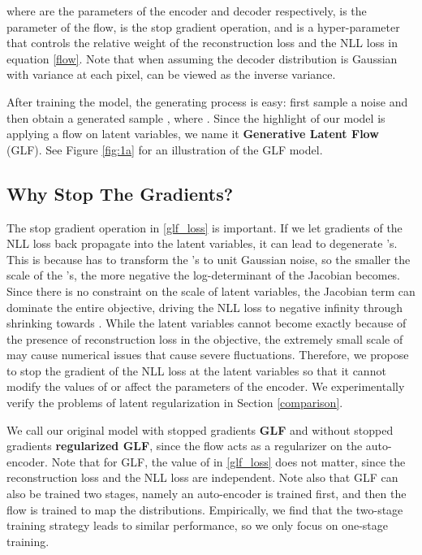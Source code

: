 \documentclass{article}
\begin{document}
where  are the parameters of the encoder and decoder respectively,  is the parameter of the flow,  is the stop gradient operation, and  is a hyper-parameter that controls the relative weight of the reconstruction loss and the NLL loss in equation \eqref{flow}. Note that when assuming the decoder distribution is Gaussian with variance  at each pixel,  can be viewed as the inverse variance.
 
After training the model, the generating process is easy: first sample a noise  and then obtain a generated sample , where . Since the highlight of our model is applying a flow on latent variables, we name it \textbf{Generative Latent Flow} (GLF). See Figure \ref{fig:1a} for an illustration of the GLF model.
 
\subsection{Why Stop The Gradients?}\label{strategies}
The stop gradient operation in \eqref{glf_loss} is important. If we let gradients of the NLL loss back propagate into the latent variables, it can lead to degenerate 's. This is because  has to transform the 's to unit Gaussian noise, so the smaller the scale of the 's, the more negative the log-determinant of the Jacobian becomes. Since there is no constraint on the scale of latent variables, the Jacobian term can dominate the entire objective, driving the NLL loss to negative infinity through shrinking  towards . While the latent variables cannot become exactly  because of the presence of reconstruction loss in the objective, the extremely small scale of  may cause numerical issues that cause severe fluctuations. Therefore, we propose to stop the gradient of the NLL loss at the latent variables so that it cannot modify the values of  or affect the parameters of the encoder. We experimentally verify the problems of latent regularization in Section \ref{comparison}.

We call our original model with  stopped gradients \textbf{GLF} and without stopped gradients \textbf{regularized GLF}, since the flow acts as a regularizer on the auto-encoder. Note that for  GLF, the value of  in \eqref{glf_loss} does not matter, since the reconstruction loss and the NLL loss are independent. Note also that GLF can also be trained two stages, namely an auto-encoder is trained first, and then the flow is trained to map the distributions. Empirically, we find that the two-stage training strategy leads to similar performance, so we only focus on one-stage training. 
\end{document}
